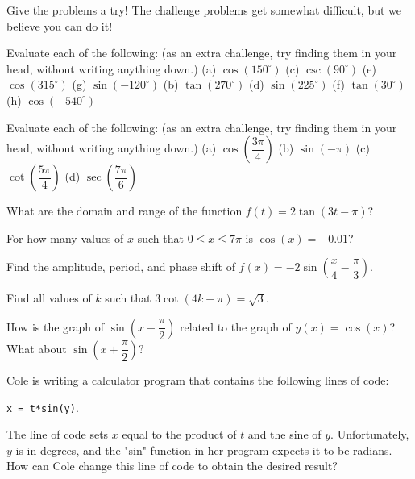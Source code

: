 \documentclass[../book.tex]{subfiles}
\begin{document}
Give the problems a try! The challenge problems get somewhat difficult, but we believe you can do it!
\begin{reviewset}
\item Evaluate each of the following: (as an extra challenge, try finding them in your head, without writing anything down.) \newline
(a) $\cos(150^{\circ})$  (c) $\csc(90^{\circ})$  (e) $\cos(315^{\circ})$  (g) $\sin(-120^{\circ})$ \newline
(b) $\tan(270^{\circ})$  (d) $\sin(225^{\circ})$  (f) $\tan(30^{\circ})$  (h) $\cos(-540^{\circ})$ \vspace{3mm}
\item Evaluate each of the following: (as an extra challenge, try finding them in your head, without writing anything down.) \newline
(a) $\cos\left(\dfrac{3\pi}{4}\right)$  (b) $\sin\left(-\pi\right)$  (c) $\cot\left(\dfrac{5\pi}{4}\right)$  (d) $\sec\left(\dfrac{7\pi}{6}\right)$ \vspace{3mm}
\item What are the domain and range of the function $f(t)=2\tan(3t-\pi)$? \vspace{3mm}
\item For how many values of $x$ such that $0\leq x\leq 7\pi$ is $\cos(x)=-0.01$? \vspace{3mm}
\item Find the amplitude, period, and phase shift of $f(x)=-2\sin\left(\dfrac{x}{4}-\dfrac{\pi}{3}\right)$. \vspace{3mm}
\item Find all values of $k$ such that $3\cot(4k-\pi)=\sqrt{3}$. \vspace{3mm}
\item How is the graph of $\sin\left(x-\dfrac{\pi}{2}\right)$ related to the graph of $y(x)=\cos(x)$? What about $\sin\left(x+\dfrac{\pi}{2}\right)$? \vspace{3mm}
\item Cole is writing a calculator program that contains the following lines of code: \begin{center}\texttt{x = t*sin(y)}.\end{center}  The line of code sets $x$ equal to the product of $t$ and the sine of $y$.  Unfortunately, $y$ is in degrees, and the "sin" function in her program expects it to be radians.  How can Cole change this line of code to obtain the desired result? \vspace{3mm}

\end{reviewset}
\end{document}
